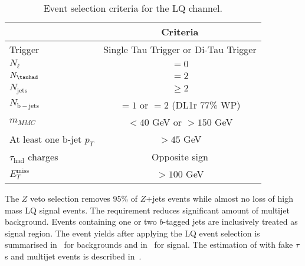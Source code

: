 \begin{table}
  \centering
  \begin{tabular}{l|c} 
    \hline\hline
                                             & Criteria \\ \hline
    Trigger                                  & Single Tau Trigger or Di-Tau Trigger \\
    $N_{\ell}$                               & $=0$ \\
    $N_{\tauhad}$                            & $=2$ \\
    $N_{\mathrm{jets}}$                      & $\geq 2$ \\
    $N_{\mathrm{b-jets}}$                    & $=1$ or $=2$ (DL1r 77\% WP)\\
    $m_{MMC}$                                & $<40$ GeV or $>150$ GeV\\
    At least one b-jet $p_T$                 & $>45$ GeV \\
    $\tau_{\mathrm{had}}$ charges            & Opposite sign\\
    $E_{T}^{\mathrm{miss}}$                  & $> 100$ GeV \\
    \hline\hline
  \end{tabular}
  \caption{Event selection criteria for the LQ \hadhad channel.}
  \label{tab:lq_hadhad_event_selection}
\end{table}


The $Z$ veto selection removes 95\% of $Z$+jets events while almost no loss of high mass LQ signal events. The \MET requirement reduces significant amount of multijet background. Events containing one or two $b$-tagged jets are inclusively treated as signal region. The event yields after applying the LQ \hadhad event selection is summarised in~ for backgrounds and in~ for signal. The estimation of \ttbar with fake $\tau$s and multijet events is described in~.

